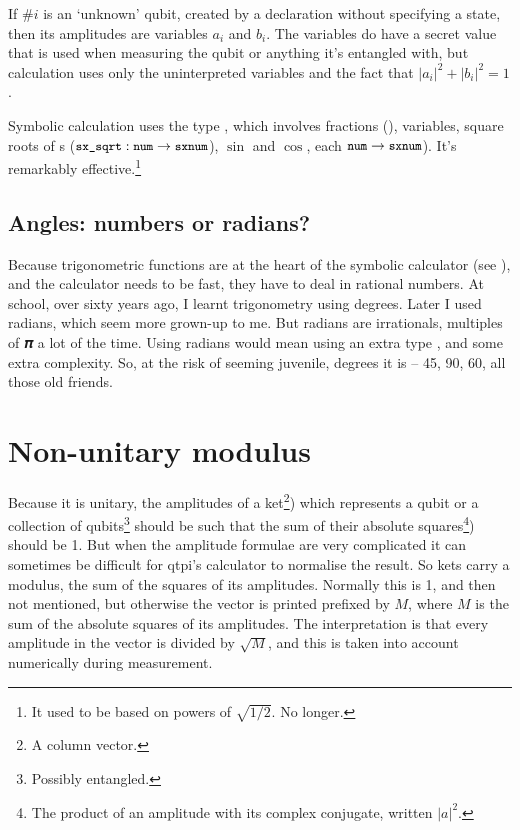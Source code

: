 If $\#i${} is an `unknown' qubit, created by a  declaration without specifying a state, then its amplitudes are variables $a_{i}$ and $b_{i}$. The variables do have a secret value that is used when measuring the qubit or anything it's entangled with, but calculation uses only the uninterpreted variables and the fact that $|a_{i}|^{2}+|b_{i}|^{2}=1$.

Symbolic calculation uses the type , which involves fractions (), variables, square roots of s ($\texttt{\small{}sx\_sqrt}: \texttt{\small{}num}->\texttt{\small{}sxnum}$), $\sin$ and $\cos$, each $\texttt{\small{}num}->\texttt{\small{}sxnum}$). It's remarkably effective.\footnote{It used to be based on powers of $\sqrt{1/2}$. No longer.}

\subsection{Angles: numbers or radians?}

Because trigonometric functions are at the heart of the symbolic calculator (see ), and the calculator needs to be fast, they have to deal in rational numbers. At school, over sixty years ago, I learnt trigonometry using degrees. Later I used radians, which seem more grown-up to me. But radians are irrationals, multiples of 𝝅 a lot of the time. Using radians would mean using an extra type , and some extra complexity. So, at the risk of seeming juvenile, degrees it is -- 45, 90, 60, all those old friends.

\section{Non-unitary modulus}

Because it is unitary, the amplitudes of a ket\footnote{A column vector.}) which represents a qubit or a collection of qubits\footnote{Possibly entangled.} should be such that the sum of their absolute squares\footnote{The product of an amplitude with its complex conjugate, written $|a|^{2}$.}) should be 1. But when the amplitude formulae are very complicated it can sometimes be difficult for qtpi's calculator to normalise the result. So kets carry a modulus, the sum of the squares of its amplitudes. Normally this is 1, and then not mentioned, but otherwise the vector is printed prefixed by \verbtt{<<}$M$\verbtt{>>}, where $M$ is the sum of the absolute squares of its amplitudes. The interpretation is that every amplitude in the vector is divided by $\sqrt{M}$, and this is taken into account numerically during measurement.

